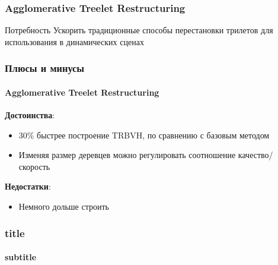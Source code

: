 \documentclass{beamer}
\begin{document}
\begin{frame}[t]
    \frametitle{Agglomerative Treelet Restructuring}
    \begin{block}{Потребность}
        Ускорить традиционные способы перестановки трилетов для использования в динамических сценах
    \end{block}

\end{frame}

\begin{frame}[t]
    \frametitle{Плюсы и минусы}
    \framesubtitle{Agglomerative Treelet Restructuring}
    \textbf{Достоинства}:
    \begin{itemize}
        \item
            30\% быстрее построение TRBVH, по сравнению с базовым методом
        \item
            Изменяя размер деревцев можно регулировать соотношение качество/скорость
    \end{itemize}
    \textbf{Недостатки}:
    \begin{itemize}
        \item
            Немного дольше строить
    \end{itemize}
\end{frame}

\begin{frame}[t]
    \frametitle{title}
    \framesubtitle{subtitle}

\end{frame}
\end{document}
